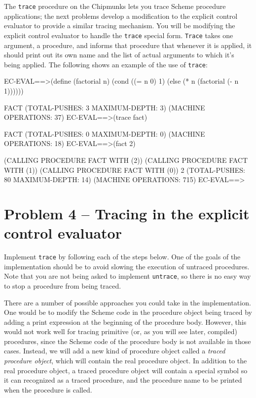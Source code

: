The {\tt trace} procedure on the Chipmunks lets you trace Scheme procedure
applications; the next problems develop a modification to the explicit
control evaluator to provide a similar tracing mechanism.  You will be
modifying the explicit control evaluator to handle the {\tt trace} special
form.  {\tt Trace} takes one argument, a procedure, and informs that procedure
that whenever it is applied, it should print out its own name and the list of
actual arguments to which it's being applied.  The following shows an example
of the use of {\tt trace}:

\beginlisp
EC-EVAL==>(define (factorial n)
                  (cond ((= n 0) 1)
                        (else (* n (factorial (- n 1))))))

FACT 
(TOTAL-PUSHES: 3 MAXIMUM-DEPTH: 3) 
(MACHINE OPERATIONS: 37) 
EC-EVAL==>(trace fact)

FACT 
(TOTAL-PUSHES: 0 MAXIMUM-DEPTH: 0) 
(MACHINE OPERATIONS: 18) 
EC-EVAL==>(fact 2)

(CALLING PROCEDURE FACT WITH (2)) 
(CALLING PROCEDURE FACT WITH (1)) 
(CALLING PROCEDURE FACT WITH (0)) 
2 
(TOTAL-PUSHES: 80 MAXIMUM-DEPTH: 14) 
(MACHINE OPERATIONS: 715) 
EC-EVAL==>
\endlisp

\section{Problem 4 -- Tracing in the explicit control evaluator}

Implement {\tt trace} by following each of the steps below.  One
of the goals of the implementation should be to avoid slowing the
execution of untraced procedures.  Note that you are not being asked 
to implement {\tt untrace}, so there is no easy way to stop a procedure 
from being traced.  

There are a number of possible approaches you could take in the implementation.
One would be to modify the Scheme code in the procedure object being traced by
adding a print expression at the beginning of the procedure body.  However,
this would not work well for tracing primitive (or, as you will see later,
compiled) procedures, since the Scheme code of the procedure body is not 
available in those cases.  Instead, we will add a new kind of procedure object 
called a {\it traced procedure object}, which will contain the real
procedure object.  In addition to the real procedure object, a traced 
procedure object will contain a special symbol so it can recognized as a 
traced procedure, and the procedure name to be printed when the procedure is 
called.

